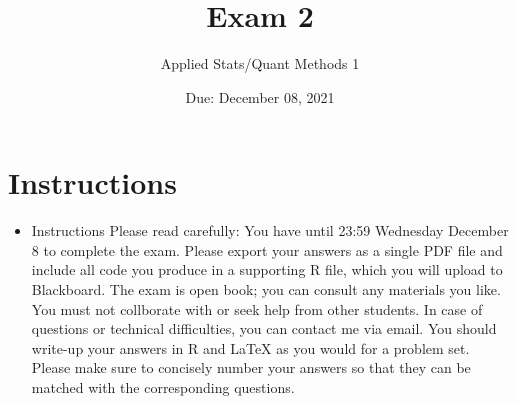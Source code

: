 \documentclass[12pt,letterpaper]{article}
\title{Exam 2}
\date{Due: December 08, 2021}
\author{Applied Stats/Quant Methods 1}
\begin{document}
	\maketitle
	\section*{Instructions}
	\begin{itemize}
		\item Instructions
		Please read carefully: You have until 23:59 Wednesday December 8 to complete
		the exam. Please export your answers as a single PDF file and include all code you
		produce in a supporting R file, which you will upload to Blackboard. The exam is
		open book; you can consult any materials you like. You must not collborate with
		or seek help from other students. In case of questions or technical difficulties, you
		can contact me via email. You should write-up your answers in R and LaTeX as you
		would for a problem set. Please make sure to concisely number your answers so that
		they can be matched with the corresponding questions. 
		
		
	\end{itemize}
	
	
	\newpage
	
	\vspace{.5cm}
\end{document}
